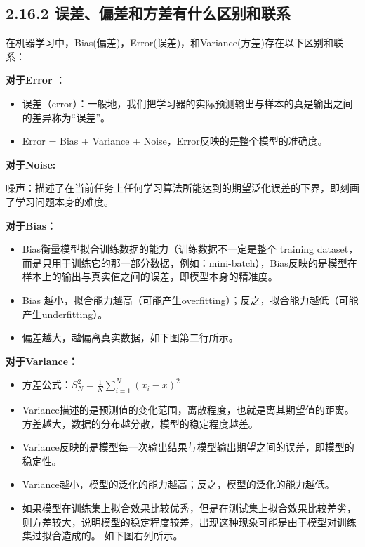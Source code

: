 \subsection{2.16.2
误差、偏差和方差有什么区别和联系}\label{ux8befux5deeux504fux5deeux548cux65b9ux5deeux6709ux4ec0ux4e48ux533aux522bux548cux8054ux7cfb}

在机器学习中，Bias(偏差)，Error(误差)，和Variance(方差)存在以下区别和联系：

\textbf{对于Error }：

\begin{itemize}
\item
  误差（error）：一般地，我们把学习器的实际预测输出与样本的真是输出之间的差异称为``误差''。
\item
  Error = Bias + Variance + Noise，Error反映的是整个模型的准确度。
\end{itemize}

\textbf{对于Noise:}

噪声：描述了在当前任务上任何学习算法所能达到的期望泛化误差的下界，即刻画了学习问题本身的难度。

\textbf{对于Bias：}

\begin{itemize}
\item
  Bias衡量模型拟合训练数据的能力（训练数据不一定是整个 training
  dataset，而是只用于训练它的那一部分数据，例如：mini-batch），Bias反映的是模型在样本上的输出与真实值之间的误差，即模型本身的精准度。
\item
  Bias
  越小，拟合能力越高（可能产生overfitting）；反之，拟合能力越低（可能产生underfitting）。
\item
  偏差越大，越偏离真实数据，如下图第二行所示。
\end{itemize}

\textbf{对于Variance：}

\begin{itemize}
\item
  方差公式：$S_{N}^{2}=\frac{1}{N}\sum_{i=1}^{N}(x_{i}-\bar{x})^{2}$
\item
  Variance描述的是预测值的变化范围，离散程度，也就是离其期望值的距离。方差越大，数据的分布越分散，模型的稳定程度越差。
\item
  Variance反映的是模型每一次输出结果与模型输出期望之间的误差，即模型的稳定性。
\item
  Variance越小，模型的泛化的能力越高；反之，模型的泛化的能力越低。
\item
  如果模型在训练集上拟合效果比较优秀，但是在测试集上拟合效果比较差劣，则方差较大，说明模型的稳定程度较差，出现这种现象可能是由于模型对训练集过拟合造成的。
  如下图右列所示。
\end{itemize}

